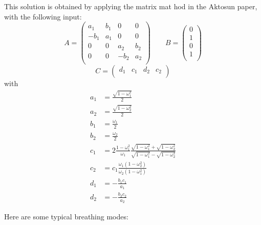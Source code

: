 \documentclass{report}
\begin{document}
This solution is obtained by applying the matrix mat hod in the Aktosun paper, with the following input:
\begin{equation}
A=\left(
\begin{array}{cccc}
 a_1 & b_1 & 0 & 0 \\
 -b_1 & a_1 & 0 & 0 \\
 0 & 0 & a_2 & b_2 \\
 0 & 0 & -b_2 & a_2 \\
\end{array}
\right)
\qquad B=\left(\begin{array}{c}
 0 \\
 1 \\
 0 \\
 1 \\
\end{array}\right)
\end{equation}
\begin{equation}
C=\left(
\begin{array}{cccc}
 d_1 & c_1 & d_2 & c_2 \\
\end{array}
\right)
\end{equation}
with
\begin{subequations}
  \begin{align}
    a_1 &=\frac{\sqrt{1-\omega_1^2}}{2}\\
    a_2 &=\frac{\sqrt{1-\omega_2^2}}{2}\\
    b_1 &=\frac{\omega_1}{2}\\
    b_2 &=\frac{\omega_2}{2}\\
    c_1 &= 2\frac{1-\omega_1^2}{\omega_1}
    \frac{\sqrt{1-\omega_1^2}+\sqrt{1-\omega_2^2}}{\sqrt{1-\omega_1^2}-\sqrt{1-\omega_2^2}}\\
    c_2 &= c_1 \frac{\omega_1(1-\omega_2^2)}{\omega_2(1-\omega_1^2)}\\
    d_1 &=-\frac{b_1 c_1}{a_1}\\
    d_2 &=-\frac{b_2 c_2}{a_2}
  \end{align}
\end{subequations}

Here are some typical breathing modes:
\end{document}
